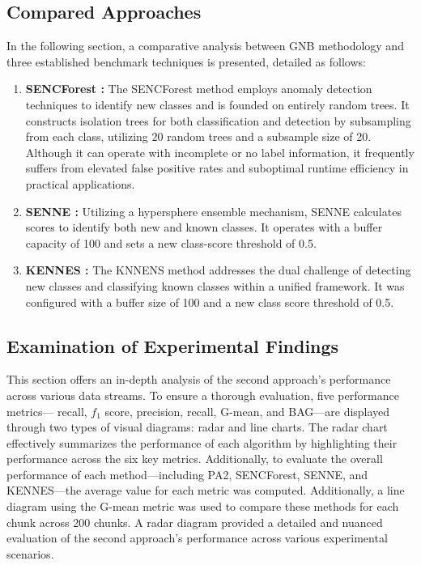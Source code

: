 \subsection{Compared Approaches}
\label{sec:compared_approaches}
In the following section, a comparative analysis between GNB methodology and three established benchmark techniques is presented, detailed as follows:
\begin{enumerate}
	\item \textbf{SENCForest \cite{mu2017classification}:} The SENCForest method employs anomaly detection techniques to identify new classes and is founded on entirely random trees. It constructs isolation trees for both classification and detection by subsampling from each class, utilizing 20 random trees and a subsample size of 20. Although it can operate with incomplete or no label information, it frequently suffers from elevated false positive rates and suboptimal runtime efficiency in practical applications.
	\item \textbf{SENNE \cite{zhu2020semi}:} Utilizing a hypersphere ensemble mechanism, SENNE calculates scores to identify both new and known classes. It operates with a buffer capacity of 100 and sets a new class-score threshold of 0.5.
	\item \textbf{KENNES \cite{zhang2022knnens}:} The KNNENS method addresses the dual challenge of detecting new classes and classifying known classes within a unified framework. It was configured with a buffer size of 100 and a new class score threshold of 0.5.
\end{enumerate}



\subsection{Examination of Experimental Findings}
\label{sec:finding}
This section offers an in-depth analysis of the second approach's performance across various data streams. To ensure a thorough evaluation, five performance metrics— recall, $f_1$ score, precision, recall, G-mean, and BAG—are displayed through two types of visual diagrams: radar and line charts. The radar chart effectively summarizes the performance of each algorithm by highlighting their performance across the six key metrics. Additionally, to evaluate the overall performance of each method—including PA2, SENCForest, SENNE, and KENNES—the average value for each metric was computed. Additionally, a line diagram using the G-mean metric was used to compare these methods for each chunk across 200 chunks. A radar diagram provided a detailed and nuanced evaluation of the second approach’s performance across various experimental scenarios.

